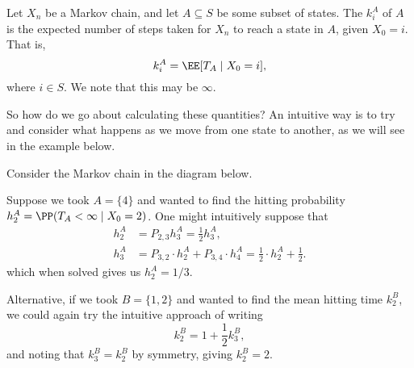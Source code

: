 \documentclass[a4paper]{scrartcl}
\begin{document}
\begin{definition}
	Let $X_n$ be a Markov chain, and let $A \subseteq S$ be some subset of states.
	The  $k^A_i$ of $A$ is the expected number of steps taken for $X_n$ to reach a state in $A$, given $X_0 = i$. That is,
	$$
	k^A_i = \EE[T_A \mid X_0 = i],
	$$
	where $i \in S$. We note that this may be $\infty$.
\end{definition}

So how do we go about calculating these quantities? An intuitive way is to try and consider what happens as we move from one state to another, as we will see in the example below.

\begin{example}
	Consider the Markov chain in the diagram below.
	\begin{center}
		\end{center}

		Suppose we took $A = \{4\}$ and wanted to find the hitting probability $h_2^A = \PP(T_A < \infty \mid X_0 = 2)$. One might intuitively suppose that
		\begin{align*}
			h_2^A &= P_{2, 3} h_3^A = \frac{1}{2} h_3^A, \\
			h_3^A &= P_{3, 2} \cdot h_2^A + P_{3, 4} \cdot h_4^A = \frac{1}{2} \cdot h_2^A + \frac{1}{2}.
		\end{align*}
		which when solved gives us $h_2^A = 1/3$.

		Alternative, if we took $B = \{1, 2\}$ and wanted to find the mean hitting time $k_2^B$, we could again try the intuitive approach of writing
		$$
		k_2^B = 1 + \frac{1}{2}k_3^B,
		$$
		and noting that $k_3^B = k_2^B$ by symmetry, giving $k_2^B = 2$.
\end{example}
\end{document}
